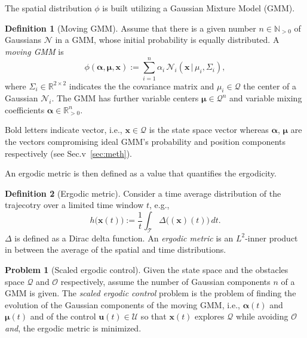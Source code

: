 \documentclass[letterpaper,10pt,conference,twoside]{IEEEtran}
\theoremstyle{definition}
\newtheorem{defn}{Definition}[section]
\newtheorem{pb}{Problem}[section]
\begin{document}
The spatial distribution $\phi$ is built utilizing a Gaussian Mixture Model (GMM). 
\begin{defn}[Moving GMM]\label{def:movement}
  Assume that there is a given number $n\in\mathbb{N}_{>0}$ of Gaussians $\mathcal{N}$ in a GMM, whose initial probability is equally distributed. A \textit{moving GMM} is
  \begin{equation}
    \phi(\boldsymbol{\alpha},\boldsymbol{\mu},\mathbf{x}):=\sum_{i=1}^n{\alpha_i\,\mathcal{N}_i(\mathbf{x}\,|\,\mu_i,\Sigma_i)},
  \end{equation}
  where $\Sigma_i\in\mathbb{R}^{2\times 2}$ indicates the the covariance matrix and $\mu_i\in\mathcal{Q}$ the center of a Gaussian $\mathcal{N}_i$. The GMM has further variable centers $\boldsymbol{\mu}\in\mathcal{Q}^n$ and variable mixing coefficients $\boldsymbol{\alpha}\in\mathbb{R}_{>0}^n$.
  
  Bold letters indicate vector, i.e., $\mathbf{x}\in\mathcal{Q}$ is the state space vector whereas $\boldsymbol{\alpha}$, $\boldsymbol{\mu}$ are the vectors compromising ideal GMM's probability and position components respectively (see Sec.v~\ref{sec:meth}).
   
\end{defn}

An ergodic metric is then defined as a value that quantifies the ergodicity.
\begin{defn}[Ergodic metric]\label{def:ergomet}
  Consider a time average distribution of the trajecotry over a limited time window $t$, e.g.,
  \begin{equation}
    h\big(\mathbf{x}(t)\big):=\frac{1}{t}\int_\mathcal{T}\Delta\big((\mathbf{x})(t)\big)\,dt.
  \end{equation}
  $\Delta$ is defined as a Dirac delta function. An \textit{ergodic metric} is an $L^2$-inner product in between the average of the spatial and time distributions.
\end{defn}

\begin{pb}[Scaled ergodic control]\label{pb}
  Given the state space and the obstacles space $\mathcal{Q}$ and $\mathcal{O}$ respectively, assume the number of Gaussian components $n$ of a GMM is given. The \textit{scaled ergodic control} problem is the problem of finding the evolution of the Gaussian components of the moving GMM, i.e., $\boldsymbol{\alpha}(t)$ and $\boldsymbol{\mu}(t)$ and of the control $\mathbf{u}(t)\in\mathcal{U}$ so that $\mathbf{x}(t)$ explores $\mathcal{Q}$ while avoiding $\mathcal{O}$ \textit{and}, the ergodic metric is minimized.
\end{pb}
\end{document}
